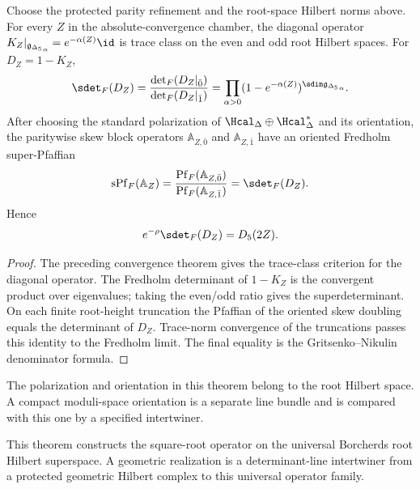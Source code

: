 \begin{theorem}
Choose the protected parity refinement and the root-space Hilbert norms above.  For every $Z$ in the absolute-convergence chamber, the diagonal operator $K_Z|_{\gIg_\alpha}=e^{-\alpha(Z)}\id$ is trace class on the even and odd root Hilbert spaces.  For $D_Z=1-K_Z$,
\[
 \sdet_F(D_Z)
 =\frac{\det_F(D_Z|_{\bar0})}{\det_F(D_Z|_{\bar1})}
 =\prod_{\alpha>0}(1-e^{-\alpha(Z)})^{\sdim\gIg_\alpha}.
\]
After choosing the standard polarization of $\Hcal_\Delta\oplus\Hcal_\Delta^*$ and its orientation, the paritywise skew block operators $\mathbb A_{Z,\bar0}$ and $\mathbb A_{Z,\bar1}$ have an oriented Fredholm super-Pfaffian
\[
 \operatorname{sPf}_F(\mathbb A_Z)=\frac{\Pf_F(\mathbb A_{Z,\bar0})}{\Pf_F(\mathbb A_{Z,\bar1})}
 =\sdet_F(D_Z).
\]  Hence
\[
 e^{-\rho}\sdet_F(D_Z)=\Dmon(2Z).
\]
\end{theorem}
\begin{proof}
The preceding convergence theorem gives the trace-class criterion for the diagonal operator.  The Fredholm determinant of $1-K_Z$ is the convergent product over eigenvalues; taking the even/odd ratio gives the superdeterminant.  On each finite root-height truncation the Pfaffian of the oriented skew doubling equals the determinant of $D_Z$.  Trace-norm convergence of the truncations passes this identity to the Fredholm limit.  The final equality is the Gritsenko--Nikulin denominator formula.
\end{proof}

\begin{remark}
The polarization and orientation in this theorem belong to the root Hilbert space.  A compact moduli-space orientation is a separate line bundle and is compared with this one by a specified intertwiner.
\end{remark}

This theorem constructs the square-root operator on the universal Borcherds root Hilbert superspace.  A geometric realization is a determinant-line intertwiner from a protected geometric Hilbert complex to this universal operator family.

